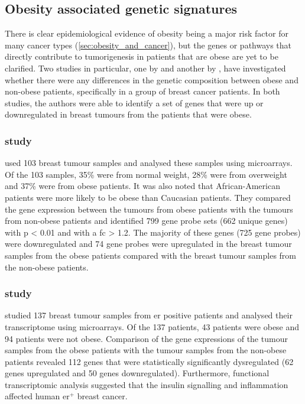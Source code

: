 \subsection{Obesity associated genetic signatures}
\label{sub:obesity_associated_genetic_signatures}

There is clear epidemiological evidence of obesity being a major risk factor for many cancer types (\cref{sec:obesity_and_cancer}), but the genes or pathways that directly contribute to tumorigenesis in patients that are obese are yet to be clarified.
Two studies in particular, one by \citet{Creighton2012} and another by \citet{Fuentes-Mattei2014}, have investigated whether there were any differences in the genetic composition between obese and non-obese patients, specifically in a group of breast cancer patients.
In both studies, the authors were able to identify a set of genes that were up or downregulated in breast tumours from the patients that were obese.

\subsubsection{\citet{Creighton2012} study}
\label{ssub:creighton_study}

\citet{Creighton2012} used 103 breast tumour samples and analysed these samples using microarrays.
Of the 103 samples, 35\% were from normal weight, 28\% were from overweight and 37\% were from obese patients.
It was also noted that African-American patients were more likely to be obese than Caucasian patients.
They compared the gene expression between the tumours from obese patients with the tumours from non-obese patients and identified 799 gene probe sets (662 unique genes) with p \textless{} 0.01 and with a \gls{fc} \textgreater{} 1.2.
The majority of these genes (725 gene probes) were downregulated and 74 gene probes were upregulated in the breast tumour samples from the obese patients compared with the breast tumour samples from the non-obese patients.

\subsubsection{\citet{Fuentes-Mattei2014} study}
\label{ssub:fuentes_mattei_study}

\citet{Fuentes-Mattei2014} studied 137 breast tumour samples from \gls{er} positive patients and analysed their transcriptome using microarrays.
Of the 137 patients, 43 patients were obese and 94 patients were not obese.
Comparison of the gene expressions of the tumour samples from the obese patients with the tumour samples from the non-obese patients revealed 112 genes that were statistically significantly dysregulated (62 genes upregulated and 50 genes downregulated).
Furthermore, functional transcriptomic analysis suggested that the insulin signalling and inflammation affected human \gls{er}$^+$ breast cancer.

